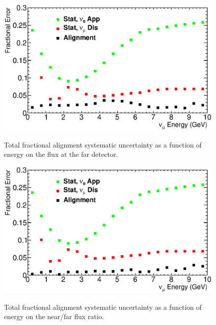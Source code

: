 \begin{figure}[ht]
  \label{fig:tot_error_far}
  \begin{center}
    {\includegraphics[width=6.0in]{figures/tot_error_far.eps}}
  \end{center}
\caption{ Total fractional alignment systematic uncertainty as a function of energy on the flux at the far detector. }
\end{figure}

\begin{figure}[ht]
  \label{fig:tot_error_nof}
  \begin{center}
    {\includegraphics[width=6.0in]{figures/tot_error_nof.eps}}
  \end{center}
\caption{ Total fractional alignment systematic uncertainty as a function of energy on the near/far flux ratio. }
\end{figure}


